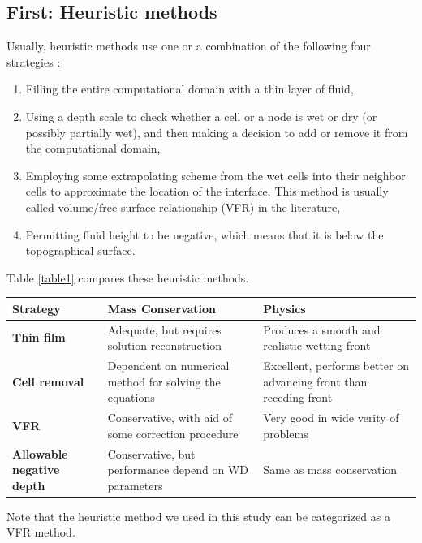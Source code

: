 \documentclass[review]{elsarticle}
\begin{document}
\subsection{First: Heuristic methods} \label{Heuristic}
Usually, heuristic methods use one or a combination of the following four strategies \cite{Medeiros2013}: 
\begin{enumerate}
        \item Filling the entire computational domain with a thin layer of fluid,
        \item Using a depth scale to check whether a cell or a node is wet or dry 
         (or possibly partially wet), and then  making a decision to add or remove it 
         from the computational domain,
        \item Employing some extrapolating scheme from the wet cells into their neighbor 
         cells to approximate the location of the interface. This method is usually called 
         volume/free-surface relationship (VFR) in the literature,
        \item Permitting fluid height to be negative, which means that it is below the topographical surface.
\end{enumerate}
Table \ref{table1} compares these heuristic methods.
\begin{center}\label{table1}
        \begin{tabular}{|p{}|p{}|p{}|}
                \hline
                {\bf Strategy}                  & {\bf Mass Conservation}                                          & {\bf Physics} \\
                \hline
                {\bf Thin film}                 & Adequate, but requires solution reconstruction 
                & Produces a smooth and realistic wetting front     \\
                \hline 
                {\bf Cell removal}              & Dependent on numerical method for solving the equations          & Excellent, performs better on advancing front than receding front \\
                \hline
                {\bf VFR}                       & Conservative, with aid of some correction procedure              & Very good in wide verity of problems      \\
                \hline
                {\bf Allowable negative depth}  & Conservative, but performance depend on WD parameters            & Same as mass conservation      \\
                \hline
        \end{tabular}
\end{center}
Note that the heuristic method we used in this study can be categorized as a VFR method. 
\end{document}
